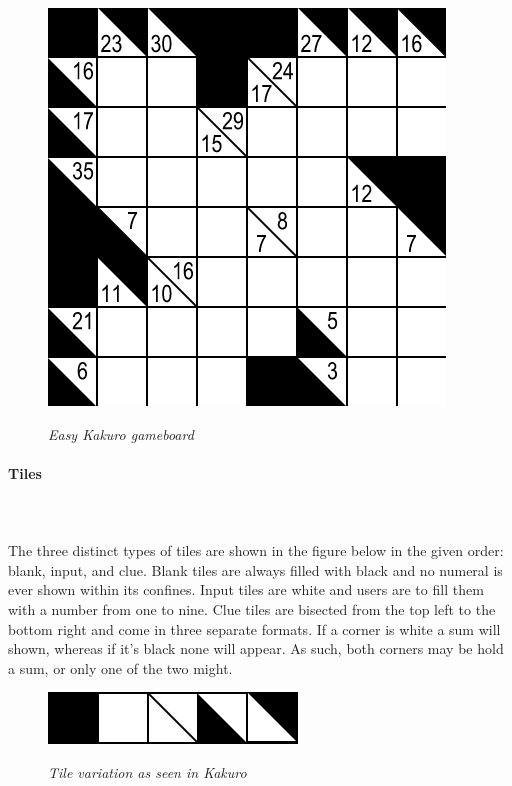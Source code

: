 \documentclass[12pt]{article}
\begin{document}
\begin{figure}[htbp]
\centerline{\includegraphics[scale=.6]{gameboard.png}}
\centerline{\textit {Easy Kakuro gameboard}}
\end{figure}

\paragraph{Tiles}\hfill\\ 
\hfill\\ 
The three distinct types of tiles are shown in the figure below in the given order: blank, input, and clue. Blank tiles are always filled with black and no numeral is ever shown within its confines. Input tiles are white and users are to fill them with a number from one to nine. Clue tiles are bisected from the top left to the bottom right and come in three separate formats. If a corner is white a sum will shown, whereas if it's black none will appear. As such, both corners may be hold a sum, or only one of the two might. \\ 

\begin{figure}[htbp]
\centerline{\includegraphics[scale=.75]{tilevariation.png}}
\centerline{\textit {Tile variation as seen in Kakuro}}
\end{figure}
\end{document}
